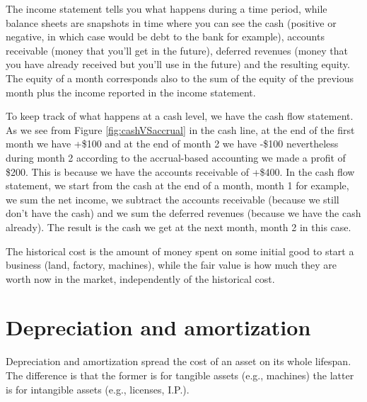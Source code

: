 The income statement tells you what happens during a time period, while balance sheets are snapshots in time where you can see the cash (positive or negative, in which case would be debt to the bank for example), accounts receivable (money that you'll get in the future), deferred revenues (money that you have already received but you'll use in the future) and the resulting equity. The equity of a month corresponds also to the sum of the equity of the previous month plus the income reported in the income statement.

To keep track of what happens at a cash level, we have the cash flow statement. As we see from Figure \ref{fig:cashVSaccrual} in the cash line, at the end of the first month we have +\$100 and at the end of month 2 we have -\$100 nevertheless during month 2 according to the accrual-based accounting we made a profit of \$200. This is because we have the accounts receivable of +\$400. In the cash flow statement, we start from the cash at the end of a month, month 1 for example, we sum the net income, we subtract the accounts receivable (because we still don't have the cash) and we sum the deferred revenues (because we have the cash already). The result is the cash we get at the next month, month 2 in this case.

The historical cost is the amount of money spent on some initial good to start a business (land, factory, machines), while the fair value is how much they are worth now in the market, independently of the historical cost.

\section{Depreciation and amortization}

Depreciation and amortization spread the cost of an asset on its whole lifespan. The difference is that the former is for tangible assets (e.g., machines) the latter is for intangible assets (e.g., licenses, I.P.). 
